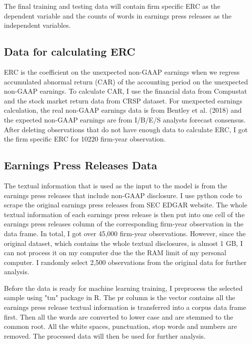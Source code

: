 \documentclass{article}
\begin{document}
The final training and testing data will contain firm specific ERC as the dependent variable and the counts of words in earnings press releases as the independent variables. 

\subsection{Data for calculating ERC}

ERC is the coefficient on the unexpected non-GAAP earnings when we regress accumulated abnormal return (CAR) of the accounting period on the unexpected non-GAAP earnings. To calculate CAR, I use the financial data from Compustat and the stock market return data from CRSP dataset. For unexpected earnings calculation, the real non-GAAP earnings data is from Bentley et al. (2018) and the expected non-GAAP earnings are from I/B/E/S analysts forecast consensus. After deleting observations that do not have enough data to calculate ERC, I got the firm specific ERC for 10220 firm-year observation.

\subsection{Earnings Press Releases Data}

The textual information that is used as the input to the model is from the earnings press releases that include non-GAAP disclosure. I use python code to scrape the original earnings press releases from SEC EDGAR website. The whole textual information of each earnings press release is then put into one cell of the earnings press releases column of the corresponding firm-year observation in the data frame. In total, I got over 45,000 firm-year observations. However, since the original dataset, which contains the whole textual disclosures, is almost 1 GB, I can not process it on my computer due the the RAM limit of my personal computer. I randomly select 2,500 observations from the original data for further analysis. 

Before the data is ready for machine learning training, I preprocess the selected sample using "tm" package in R. The pr column is the vector contains all the earnings press release textual information is transferred into a corpus data frame first. Then all the words are converted to lower case and are stemmed to the common root. All the white spaces, punctuation, stop words and numbers are removed. The processed data will then be used for further analysis.  
\end{document}

